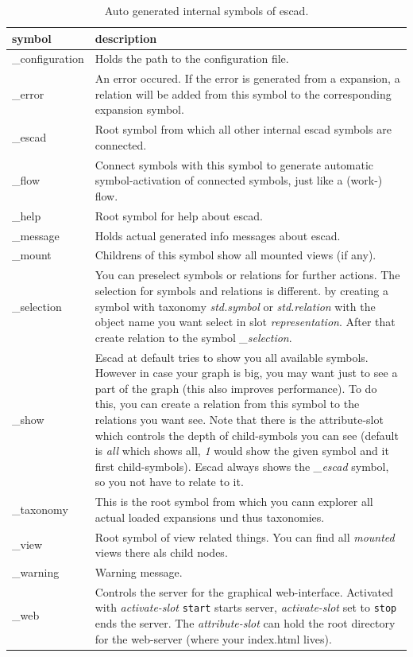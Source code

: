 \documentclass[a4paper, 12pt, openany]{scrbook}
\begin{document}
\begin{table}[htbp]
\centering
\begin{tabular}{|p{4cm}|p{12cm}|}
  \hline
  \textbf{symbol} & \textbf{description} \\
  \hline
  \_configuration & Holds the path to the configuration file. \\
  \hline
  \_error & An error occured. If the error is generated from a expansion, a relation will be added from this symbol to the corresponding expansion symbol. \\
  \hline
  \_escad & Root symbol from which all other internal escad symbols are connected. \\
  \hline
  \_flow & Connect symbols with this symbol to generate automatic symbol-activation of connected symbols, just like a (work-) flow. \\
  \hline
  \_help & Root symbol for help about escad. \\
  \hline
  \_message & Holds actual generated info messages about escad. \\
  \hline
  \_mount & Childrens of this symbol show all mounted views (if any). \\
  \hline
  \_selection & You can preselect symbols or relations for further actions. The selection for symbols and relations is different. by creating a symbol with taxonomy \emph{std.symbol} or \emph{std.relation} with the object name you want select in slot \emph{representation}. After that create relation to the symbol \emph{\_selection}. \\
  \hline
  \_show & Escad at default tries to show you all available symbols. However in case your graph is big, you may want just to see a part of the graph (this also improves performance). To do this, you can create a relation from this symbol to the relations you want see. Note that there is the attribute-slot which controls the depth of child-symbols you can see (default is \emph{all} which shows all, \emph{1} would show the given symbol and it first child-symbols). Escad always shows the \emph{\_escad} symbol, so you not have to relate to it. \\
  \hline
  \_taxonomy & This is the root symbol from which you cann explorer all actual loaded expansions und thus taxonomies. \\
  \hline
  \_view & Root symbol of view related things. You can find all \emph{mounted} views there als child nodes. \\
  \hline
  \_warning & Warning message. \\
  \hline
  \_web & Controls the server for the graphical web-interface. Activated with \emph{activate-slot} \texttt{start} starts server, \emph{activate-slot} set to \texttt{stop} ends the server. The \emph{attribute-slot} can hold the root directory for the web-server (where your index.html lives). \\
  \hline
\end{tabular}
\caption{Auto generated internal symbols of escad.}
\label{tab:internal-symbols}
\end{table}
\end{document}
